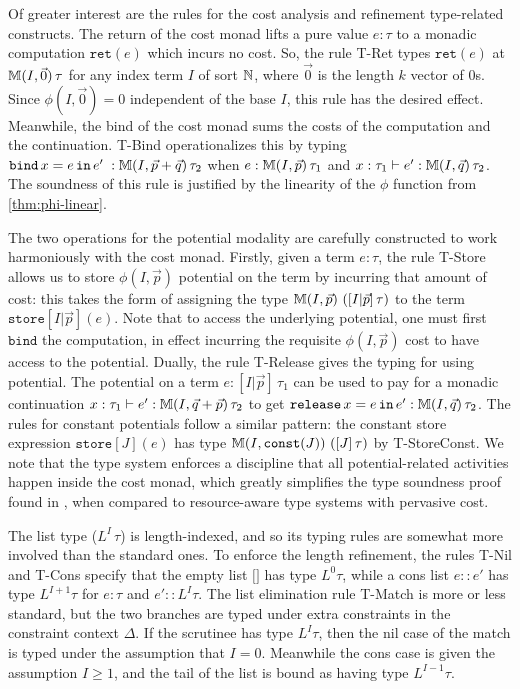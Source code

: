 Of greater interest are the rules for the cost analysis and refinement type-related constructs. The return of the cost monad lifts a pure value $e : \tau$ to a monadic computation $\texttt{ret}(e)$ which incurs no cost. So, the rule T-Ret types $\texttt{ret}(e)$ at $\mathbb{M}(I,\vec{0}) \, \tau$ for any index term $I$ of sort $\mathbb{N}$, where $\vec{0}$ is the length $k$ vector of $0$s. Since $\phi(I,\vec{0}) = 0$ independent of the base $I$, this rule has the desired effect. Meanwhile, the bind of the cost monad sums the costs of the computation and the continuation. T-Bind operationalizes this by typing $\texttt{bind}\, x = e \, \texttt{in} \, e' \; : \mathbb{M}(I,\vec{p} + \vec{q}) \, \tau_2$ when $e : \mathbb{M}(I,\vec{p}) \, \tau_1$ and $x : \tau_1 \vdash e' : \mathbb{M}(I,\vec{q}) \, \tau_2$. The soundness of this rule is justified by the linearity of the $\phi$ function from \autoref{thm:phi-linear}.

The two operations for the potential modality are carefully constructed to work harmoniously with the cost monad. Firstly, given a term $e : \tau$, the rule T-Store allows us to store $\phi(I,\vec{p})$ potential on the term by incurring that amount of cost: this takes the form of assigning the type $\mathbb{M}(I,\vec{p}) \, \left([I|\vec{p}] \, \tau\right)$ to the term $\texttt{store}[I|\vec{p}](e)$. Note that to access the underlying potential, one must first $\texttt{bind}$ the computation, in effect incurring the requisite $\phi(I,\vec{p})$ cost to have access to the potential. Dually, the rule T-Release gives the typing for using potential. The potential on a term $e : [I|\vec{p}] \, \tau_1$ can be used to pay for a monadic continuation $x : \tau_1 \vdash e' : \mathbb{M}(I,\vec{q} + \vec{p}) \, \tau_2$ to get
$\texttt{release}\, x = e \, \texttt{in} \, e' : \mathbb{M}(I,\vec{q}) \, \tau_2$. The rules for constant potentials follow a similar pattern: the constant store expression $\texttt{store}[J](e)$ has type $\mathbb{M}(I,\texttt{const}(J)) \, \left([J] \, \tau\right)$ by T-StoreConst.
We note that the type system enforces a discipline that all potential-related activities happen inside the cost monad, which greatly simplifies the type soundness proof found in \citet{rajani-et-al:popl21}, when compared to resource-aware type systems with pervasive cost.

The list type ($L^I \, \tau$) is length-indexed, and so its typing rules are somewhat more involved than the standard ones. To enforce the length refinement, the rules T-Nil and T-Cons specify that the empty list $\texttt{[]}$ has type $L^0 \tau$, while a cons list $e :: e'$ has type $L^{I+1} \tau$ for $e : \tau$ and $e' :: L^I \tau$. The list elimination rule T-Match is more or less standard, but the two branches are typed under extra constraints in the constraint context $\Delta$. If the scrutinee has type $L^I \tau$, then the nil case of the match is typed under the assumption that $I = 0$. Meanwhile the cons case is given the assumption $I \geq 1$, and the tail of the list is bound as having type $L^{I-1} \tau$.

